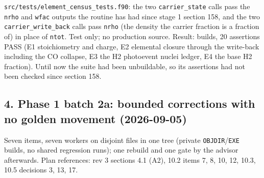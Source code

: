 \documentclass[english,a4paper]{my_memo}
\begin{document}
\texttt{src/tests/element\_census\_tests.f90}: the two \texttt{carrier\_state} calls pass the
\texttt{nrho} and \texttt{wfac} outputs the routine has had since stage 1 section 158, and
the two \texttt{carrier\_write\_back} calls pass \texttt{nrho} (the density the carrier
fraction is a fraction of) in place of \texttt{ntot}. Test only; no production
source. Result: builds, 20 assertions PASS (E1 stoichiometry and charge, E2
elemental closure through the write-back including the CO collapse, E3 the
H2 photoevent nuclei ledger, E4 the base H2 fraction). Until now the suite
had been unbuildable, so its assertions had not been checked since section
158.

\subsection{4. Phase 1 batch 2a: bounded corrections with no golden movement (2026-09-05)}\label{4-phase-1-batch-2a-bounded-corrections-with-no-golden-movement-2026-09-05}

Seven items, seven workers on disjoint files in one tree (private
\texttt{OBJDIR}/\texttt{EXE} builds, no shared regression runs); one rebuild and one gate
by the advisor afterwards. Plan references: rev 3 sections 4.1 (A2), 10.2
items 7, 8, 10, 12, 10.3, 10.5 decisions 3, 13, 17.
\end{document}
